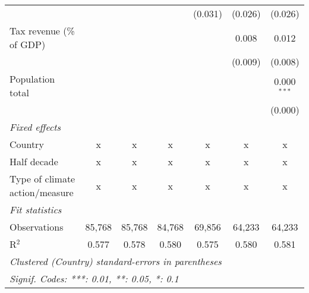 \begin{tabular}{lcccccc}
                                                            &         &               &               & (0.031)       & (0.026)       & (0.026)\\   
   Tax revenue (\% of GDP)                                  &         &               &               &               & 0.008         & 0.012\\   
                                                            &         &               &               &               & (0.009)       & (0.008)\\   
   Population total                                         &         &               &               &               &               & 0.000$^{***}$\\   
                                                            &         &               &               &               &               & (0.000)\\   
   \emph{Fixed effects}\\
   Country                                                  & x       & x             & x             & x             & x             & x\\  
   Half decade                                              & x       & x             & x             & x             & x             & x\\  
   Type of climate action/measure                           & x       & x             & x             & x             & x             & x\\  
   \midrule \emph{Fit statistics}\\
   Observations                                             & 85,768  & 85,768        & 84,768        & 69,856        & 64,233        & 64,233\\  
   R$^2$                                                    & 0.577   & 0.578         & 0.580         & 0.575         & 0.580         & 0.581\\  
   \midrule
   \multicolumn{7}{l}{\emph{Clustered (Country) standard-errors in parentheses}}\\
   \multicolumn{7}{l}{\emph{Signif. Codes: ***: 0.01, **: 0.05, *: 0.1}}\\
\end{tabular}
\par\endgroup


